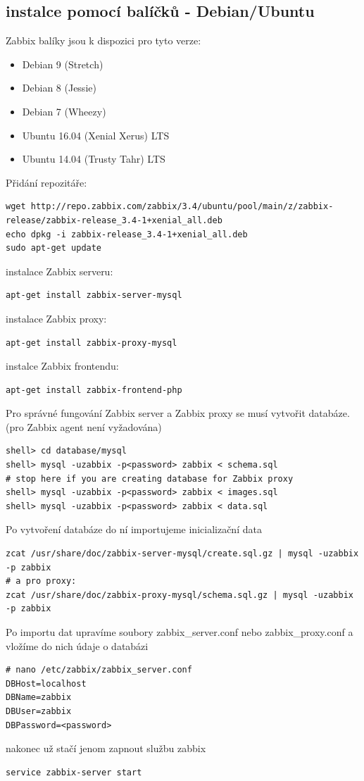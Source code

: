 \documentclass{article}
\begin{document}
\subsection{instalce pomocí balíčků - Debian/Ubuntu}
Zabbix balíky jsou k dispozici pro tyto verze:
\begin{itemize}
    \item Debian 9 (Stretch)
    \item Debian 8 (Jessie)
    \item Debian 7 (Wheezy)
    \item Ubuntu 16.04 (Xenial Xerus) LTS
    \item Ubuntu 14.04 (Trusty Tahr) LTS
\end{itemize}
Přidání repozitáře:
\begin{verbatim}
wget http://repo.zabbix.com/zabbix/3.4/ubuntu/pool/main/z/zabbix-release/zabbix-release_3.4-1+xenial_all.deb
echo dpkg -i zabbix-release_3.4-1+xenial_all.deb
sudo apt-get update
\end{verbatim}
\newline
instalace Zabbix serveru:
\begin{verbatim}
apt-get install zabbix-server-mysql
\end{verbatim}
\newline
instalace Zabbix proxy:
\begin{verbatim}
apt-get install zabbix-proxy-mysql
\end{verbatim}
\newline
instalce Zabbix frontendu:
\begin{verbatim}
apt-get install zabbix-frontend-php
\end{verbatim}
\newline
Pro správné fungování Zabbix server a Zabbix proxy se musí vytvořit databáze. (pro Zabbix agent není vyžadována)
\begin{verbatim}
shell> cd database/mysql
shell> mysql -uzabbix -p<password> zabbix < schema.sql
# stop here if you are creating database for Zabbix proxy
shell> mysql -uzabbix -p<password> zabbix < images.sql
shell> mysql -uzabbix -p<password> zabbix < data.sql
\end{verbatim}
Po vytvoření databáze do ní importujeme inicializační data
\begin{verbatim}
zcat /usr/share/doc/zabbix-server-mysql/create.sql.gz | mysql -uzabbix -p zabbix
# a pro proxy:
zcat /usr/share/doc/zabbix-proxy-mysql/schema.sql.gz | mysql -uzabbix -p zabbix
\end{verbatim}
Po importu dat upravíme soubory zabbix\_server.conf nebo zabbix\_proxy.conf a vložíme do nich údaje o databázi
\begin{verbatim}
# nano /etc/zabbix/zabbix_server.conf
DBHost=localhost
DBName=zabbix
DBUser=zabbix
DBPassword=<password>
\end{verbatim}
nakonec už stačí jenom zapnout službu zabbix
\begin{verbatim}
service zabbix-server start
\end{verbatim}
\end{document}
